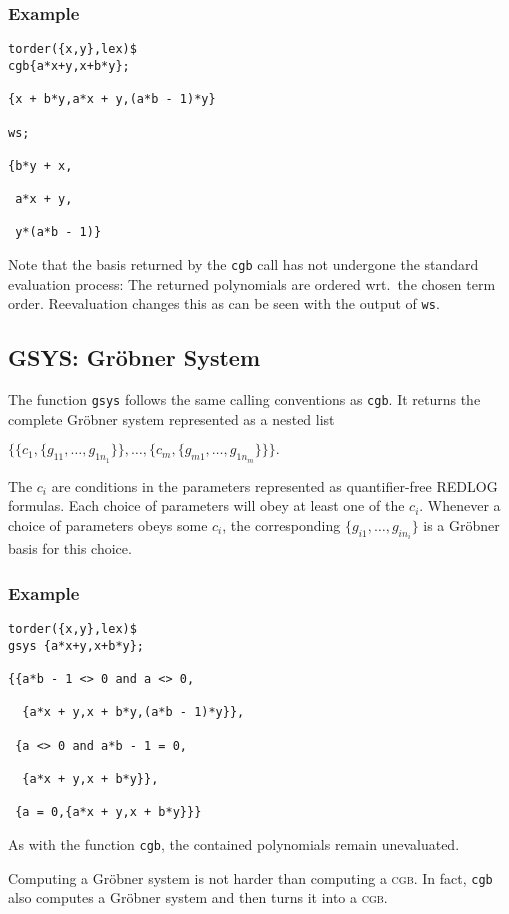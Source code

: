 \subsubsection*{Example}
\begin{verbatim}
torder({x,y},lex)$
cgb{a*x+y,x+b*y};

{x + b*y,a*x + y,(a*b - 1)*y}

ws;

{b*y + x,

 a*x + y,

 y*(a*b - 1)}
\end{verbatim}
Note that the basis returned by the \texttt{cgb} call has not undergone
the standard evaluation process: The returned polynomials are ordered
wrt.~the chosen term order. Reevaluation changes this as can be seen
with the output of \texttt{ws}.
%
\subsection{GSYS: Gr\"obner System}
 The function \texttt{gsys} follows the
same calling conventions as \texttt{cgb}. It returns the complete
Gr\"obner system represented as a nested list
\begin{center}
\(
\bigl\{\bigl\{c_1,\{g_{11},\ldots,g_{1n_1}\}\bigr\},\dots,
\bigl\{c_m,\{g_{m1},\dots,g_{1n_m}\}\bigr\}\bigr\}.
\)
\end{center}
The $c_i$ are conditions in the parameters represented as
quantifier-free REDLOG formulas. Each choice of parameters will obey
at least one of the $c_i$. Whenever a choice of parameters obeys
some $c_i$, the corresponding $\{g_{i1},\ldots,g_{in_i}\}$
is a Gr\"obner basis for this choice.
%
\subsubsection*{Example}
\begin{verbatim}
torder({x,y},lex)$
gsys {a*x+y,x+b*y};

{{a*b - 1 <> 0 and a <> 0,

  {a*x + y,x + b*y,(a*b - 1)*y}},

 {a <> 0 and a*b - 1 = 0,

  {a*x + y,x + b*y}},

 {a = 0,{a*x + y,x + b*y}}}
\end{verbatim}
As with the function \texttt{cgb}, the contained polynomials remain
unevaluated.

Computing a Gr\"obner system is not harder than computing a \textsc{cgb}.
In fact, \texttt{cgb} also computes a Gr\"obner system and then turns it
into a \textsc{cgb}.

